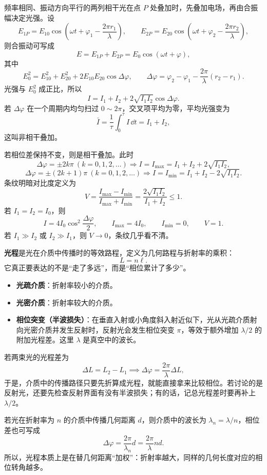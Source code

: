 \documentclass[lang=cn,11pt]{elegantbook}
\begin{document}
\begin{definition}[干涉的光强分布]
频率相同、振动方向平行的两列相干光在点 \(P\) 处叠加时，先叠加电场，再由合振幅决定光强。设
\[
E_{1P}=E_{10}\cos\!\left(\omega t+\varphi_1-\frac{2\pi r_1}{\lambda}\right),\qquad
E_{2P}=E_{20}\cos\!\left(\omega t+\varphi_2-\frac{2\pi r_2}{\lambda}\right),
\]
则合振动可写成
\[
E=E_{1P}+E_{2P}=E_0\cos(\omega t+\varphi),
\]
其中
\[
E_0^2=E_{10}^2+E_{20}^2+2E_{10}E_{20}\cos\Delta\varphi,\qquad
\Delta\varphi=\varphi_2-\varphi_1-\frac{2\pi}{\lambda}(r_2-r_1).
\]
光强与 \(E_0^2\) 成正比，所以
\[
I=I_1+I_2+2\sqrt{I_1I_2}\cos\Delta\varphi.
\]
若 \(\Delta\varphi\) 在一个周期内均匀扫过 \(0\sim2\pi\)，交叉项平均为零，平均光强变为
\[
\bar I=\frac{1}{\tau}\int_0^\tau I\,\dd t=I_1+I_2,
\]
这叫非相干叠加。

若相位差保持不变，则是相干叠加。此时
\[
\Delta\varphi=\pm 2k\pi\ (k=0,1,2,\dots)\Rightarrow I=I_{\max}=I_1+I_2+2\sqrt{I_1I_2},
\]
\[
\Delta\varphi=\pm(2k+1)\pi\ (k=0,1,2,\dots)\Rightarrow I=I_{\min}=I_1+I_2-2\sqrt{I_1I_2}.
\]
条纹明暗对比度定义为
\[
V=\frac{I_{\max}-I_{\min}}{I_{\max}+I_{\min}}
=\frac{2\sqrt{I_1I_2}}{I_1+I_2}\le1.
\]
若 \(I_1=I_2=I_0\)，则
\[
I=4I_0\cos^2\frac{\Delta\varphi}{2},\qquad I_{\max}=4I_0,\qquad I_{\min}=0,\qquad V=1.
\]
若 \(I_1\gg I_2\) 或 \(I_2\gg I_1\)，则 \(V\to0\)，条纹几乎看不清。
\end{definition}

\begin{definition}[光程]\label{def:optical-path}
\textbf{光程}是光在介质中传播时的等效路程，定义为几何路程与折射率的乘积：
\[
L=n\ell.
\]
它真正要表达的不是“走了多远”，而是“相位累计了多少”。

\begin{itemize}
    \item \textbf{光疏介质}：折射率较小的介质。
    \item \textbf{光密介质}：折射率较大的介质。
    \item \textbf{相位突变（半波损失）}：在垂直入射或小角度斜入射近似下，光从光疏介质射向光密介质并发生反射时，反射光会发生相位突变 \(\pi\)，等效于额外增加 \(\lambda/2\) 的附加光程差。这里 \(\lambda\) 是真空中的波长。
\end{itemize}

若两束光的光程差为
\[
\Delta L=L_2-L_1\implies
\Delta\varphi=\frac{2\pi}{\lambda}\Delta L,
\]
于是，介质中的传播路径只要先折算成光程，就能直接拿来比较相位。若讨论的是反射光，还要先检查反射界面有没有半波损失；有的话，记总光程差时要再补上 \(\lambda/2\)。

若光在折射率为 \(n\) 的介质中传播几何距离 \(d\)，则介质中的波长为 \(\lambda_n=\lambda/n\)，相位差也可写成
\[
\Delta\varphi=\frac{2\pi}{\lambda_n}d=\frac{2\pi}{\lambda}nd.
\]
所以，光程本质上是在替几何距离“加权”：折射率越大，同样的几何长度对应的相位转角越多。
\end{definition}
\end{document}
